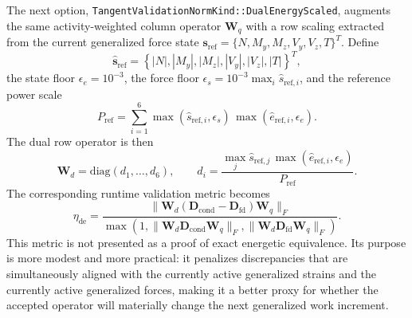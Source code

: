 The next option,
\texttt{TangentValidationNormKind::DualEnergyScaled}, augments the same
activity-weighted column operator \(\mathbf{W}_q\) with a row scaling extracted
from the current generalized force state
\(\mathbf{s}_{\mathrm{ref}}=
\{N,M_y,M_z,V_y,V_z,T\}^{T}\).  Define
\begin{equation}
  \widehat{\mathbf{s}}_{\mathrm{ref}}
  =
  \left\{
    |N|, |M_y|, |M_z|, |V_y|, |V_z|, |T|
  \right\}^{T},
\end{equation}
the state floor
\(\epsilon_e = 10^{-3}\),
the force floor
\(\epsilon_s = 10^{-3}\max_i \widehat s_{\mathrm{ref},i}\),
and the reference power scale
\begin{equation}
  P_{\mathrm{ref}}
  =
  \sum_{i=1}^{6}
  \max(\widehat s_{\mathrm{ref},i}, \epsilon_s)\,
  \max(\widehat e_{\mathrm{ref},i}, \epsilon_e).
  \label{eq:ms-pub-dual-energy-scale}
\end{equation}
The dual row operator is then
\begin{equation}
  \mathbf{W}_d
  =
  \mathrm{diag}(d_1,\dots,d_6),
  \qquad
  d_i
  =
  \frac{\max_j \widehat s_{\mathrm{ref},j}\,
        \max(\widehat e_{\mathrm{ref},i}, \epsilon_e)}
       {P_{\mathrm{ref}}}.
  \label{eq:ms-pub-dual-energy-rows}
\end{equation}
The corresponding runtime validation metric becomes
\begin{equation}
  \eta_{\mathrm{de}}
  =
  \frac{\lVert
      \mathbf{W}_d(\mathbf{D}_{\mathrm{cond}}-\mathbf{D}_{\mathrm{fd}})
      \mathbf{W}_q
    \rVert_F}
       {\max\!\left(
          1,
          \lVert \mathbf{W}_d \mathbf{D}_{\mathrm{cond}}\mathbf{W}_q \rVert_F,
          \lVert \mathbf{W}_d \mathbf{D}_{\mathrm{fd}}\mathbf{W}_q \rVert_F
       \right)}.
  \label{eq:ms-pub-dual-energy-gap}
\end{equation}
This metric is not presented as a proof of exact energetic equivalence.  Its
purpose is more modest and more practical: it penalizes discrepancies that are
simultaneously aligned with the currently active generalized strains and the
currently active generalized forces, making it a better proxy for whether the
accepted operator will materially change the next generalized work increment.

